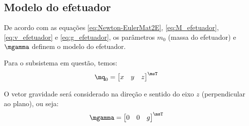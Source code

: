 \documentclass[]{politex}
\begin{document}
\subsection{Modelo do efetuador}

De acordo com as equações \eqref{eq:Newton-EulerMat2E}, \eqref{eq:M_efetuador}, \eqref{eq:v_efetuador} e \eqref{eq:g_efetuador}, os parâmetros $m_0$ (massa do efetuador) e $\mgamma$ definem o modelo do efetuador.




Para o subsistema em questão, temos:
\begin{equation}
\mq_0 = \begin{bmatrix}
x & y & z
\end{bmatrix}^\msT
\end{equation}

O vetor gravidade será considerado na direção e sentido do eixo $z$ (perpendicular ao plano), ou seja:
\begin{equation}
\mgamma = \begin{bmatrix}
0 & 0 & g
\end{bmatrix}^\msT
\end{equation}

\end{document}
